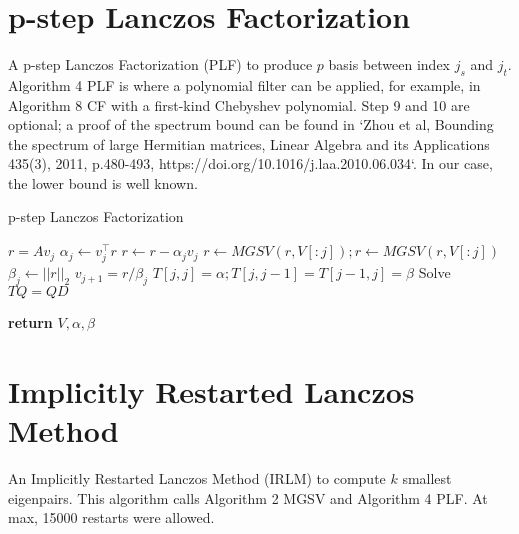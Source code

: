 \documentclass[a4paper]{article}
\begin{document}
\section{p-step Lanczos Factorization}
A p-step Lanczos Factorization (PLF) to produce $p$ basis between index $j_s$ and $j_t$. Algorithm 4 PLF is where a polynomial filter can be applied, for example, in Algorithm 8 CF with a first-kind Chebyshev polynomial. Step 9 and 10 are optional; a proof of the spectrum bound can be found in `Zhou et al, Bounding the spectrum of large Hermitian matrices,
Linear Algebra and its Applications 435(3), 2011, p.480-493, https://doi.org/10.1016/j.laa.2010.06.034`. In our case, the lower bound is well known.

\begin{algorithm}
\caption{p-step Lanczos Factorization}\label{alg:PLF}
\begin{algorithmic}[1]


    \State $r = Av_j$ 
    \State $\alpha_j \gets v_j^\top r  $
    \State $r \gets r - \alpha_j v_j $
    \State $r \gets MGSV(r,V[:j]); r \gets MGSV(r,V[:j])$ 
    \State $\beta_j \gets ||r||_2  $
    \State $v_{j+1} = r / \beta_j$
\EndFor
\State $T[j,j] = \alpha; T[j,j-1] = T[j-1,j] = \beta$
\State Solve $TQ=QD$ 


\State \textbf{return} $V, \alpha, \beta$ 

\EndProcedure
\end{algorithmic}
\end{algorithm}



\pagebreak





\section{Implicitly Restarted Lanczos Method}
An Implicitly Restarted Lanczos Method (IRLM) to compute $k$ smallest eigenpairs. This algorithm calls Algorithm 2 MGSV and Algorithm 4 PLF. At max, 15000 restarts were allowed.
\end{document}
